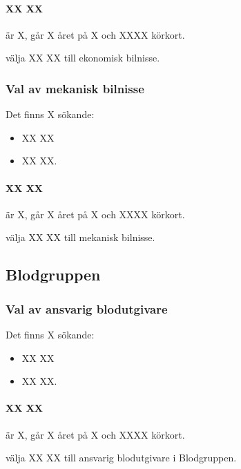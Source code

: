 \documentclass[hidelinks]{sektionsmote}
\begin{document}
\paragraph{XX XX} är X, går X året på X och XXXX körkort.

\begin{beslut}
  \item välja XX XX till ekonomisk bilnisse.
\end{beslut}


\subsubsection{Val av mekanisk bilnisse}
Det finns X sökande:
\begin{itemize}
    \item XX XX
    \item XX XX.
\end{itemize}

\paragraph{XX XX} är X, går X året på X och XXXX körkort.

\begin{beslut}
  \item välja XX XX till mekanisk bilnisse.
\end{beslut}


\subsection{Blodgruppen}
\subsubsection{Val av ansvarig blodutgivare}
Det finns X sökande:
\begin{itemize}
    \item XX XX
    \item XX XX.
\end{itemize}

\paragraph{XX XX} är X, går X året på X och XXXX körkort.

\begin{beslut}
  \item välja XX XX till ansvarig blodutgivare i Blodgruppen.
\end{beslut}
\end{document}
